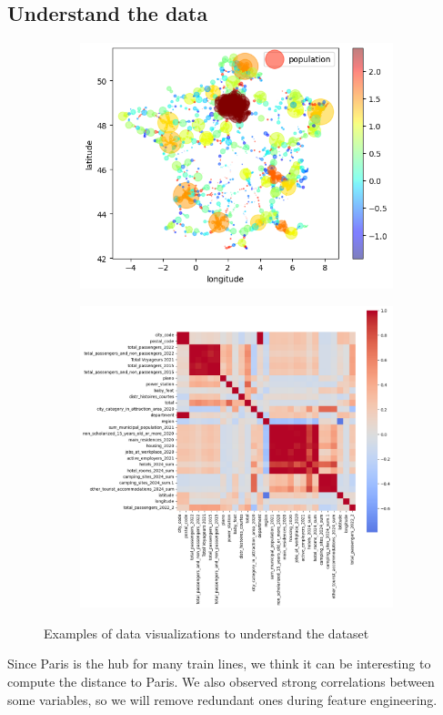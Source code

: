 \subsection{Understand the data}
\begin{figure}[h]
    \centering
    \begin{subfigure}[b]{0.45\textwidth}
         \centering
         \includegraphics[width=\textwidth]{assets/images/french-map-train-stations.png}
     \end{subfigure}
    \hfill
     \begin{subfigure}[b]{0.4\textwidth}
         \centering
         \includegraphics[width=\textwidth]{assets/images/variable-correlation.png}
     \end{subfigure}
     \caption{Examples of data visualizations to understand the dataset}
\end{figure}
Since Paris is the hub for many train lines, we think it can be interesting to compute the distance to Paris. We also observed strong correlations between some variables, so we will remove redundant ones during feature engineering.\label{paris:center-france}